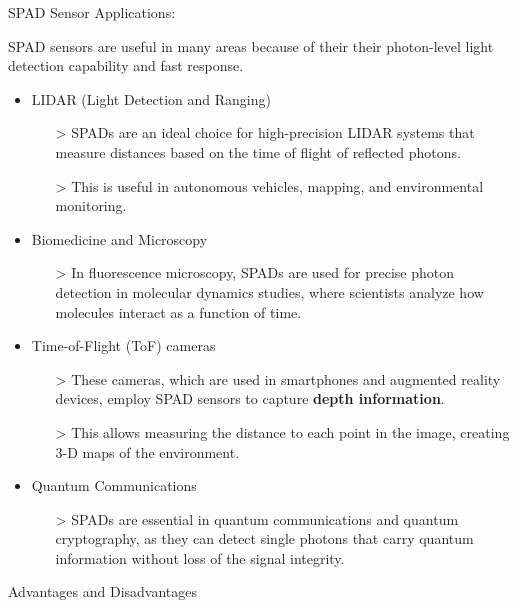 \noindent SPAD Sensor Applications:

\vspace{5 mm}

\noindent SPAD sensors are useful in many areas because of their their photon-level light detection capability and fast response.

\begin{itemize}
\item LIDAR (Light Detection and Ranging)
    \begin{itemize}
    \item[>] SPADs are an ideal choice for high-precision LIDAR systems that measure distances based on the time of flight of reflected photons. 
    \item[>] This is useful in autonomous vehicles, mapping, and environmental monitoring.
    \end{itemize}
\item Biomedicine and Microscopy
    \begin{itemize}
    \item[>] In fluorescence microscopy, SPADs are used for precise photon detection in molecular dynamics studies, where scientists analyze how molecules interact as a function of time.
    \end{itemize}
\item Time-of-Flight (ToF) cameras
    \begin{itemize}
    \item[>] These cameras, which are used in smartphones and augmented reality devices, employ SPAD sensors to capture \textbf{depth information}.
    \item[>] This allows measuring the distance to each point in the image, creating 3-D maps of the environment.
    \end{itemize}
\item Quantum Communications
    \begin{itemize}
    \item[>] SPADs are essential in quantum communications and quantum cryptography, as they can detect single photons that carry quantum information without loss of the signal integrity.
    \end{itemize}
\end{itemize}

\vspace{5 mm}

\noindent Advantages and Disadvantages

